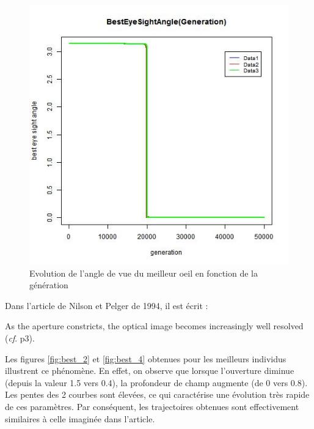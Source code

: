 \documentclass[a4paper,11pt]{article}
\begin{document}
\begin{figure}[htbp]
\begin{center}
\includegraphics[width=.5\linewidth]{best_eye_sight_angle.jpeg}
\caption{Evolution de l'angle de vue du meilleur oeil en fonction de la génération}
\label{fig:best_9}
\end{center}
\end{figure}

Dans l'article de Nilson et Pelger de 1994, il est écrit : 

\begin{displayquote}
As the aperture constricts, the optical image becomes increasingly well resolved (\textit{cf}. p3).
\end{displayquote}

Les figures \ref{fig:best_2} et \ref{fig:best_4} obtenues pour les meilleurs individus illustrent ce phénomène. En effet, on observe que lorsque l'ouverture diminue (depuis la valeur 1.5 vers 0.4), la profondeur de champ augmente (de 0 vers 0.8). Les pentes des 2 courbes sont élevées, ce qui caractérise une évolution très rapide de ces paramètres. Par conséquent, les trajectoires obtenues sont effectivement similaires à celle imaginée dans l'article.
\end{document}
